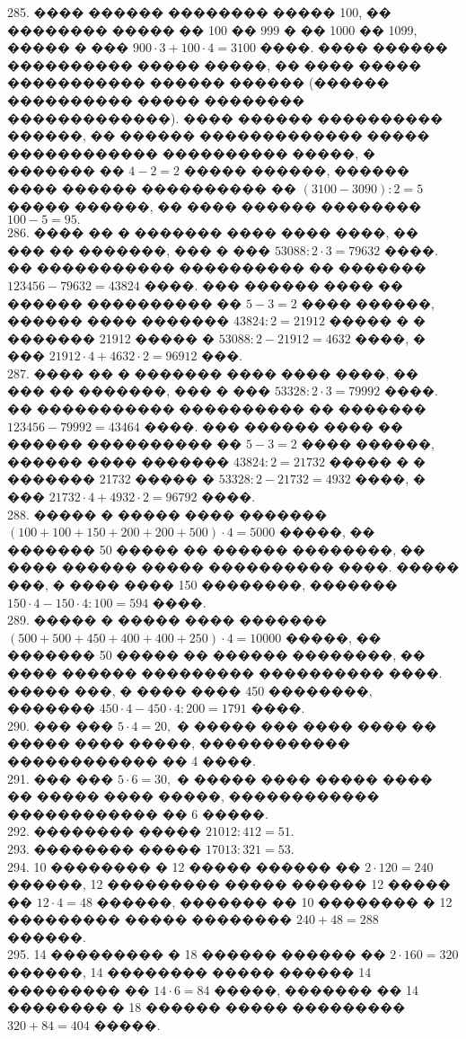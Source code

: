 \documentclass[12pt]{article}
\begin{document}
285. ���� ������ �������� ����� 100, �� �������� ����� �� 100 �� 999 � �� 1000 �� 1099, ����� � ��� $900\cdot3+100\cdot4=3100$ ����. ���� ������ ���������� ����� �����, �� ���� ����� ����������� ������ ������ (������ ���������� ����� �������� �������������). ���� ������ ���������� ������, �� ������ ������������� ����� ������������ ���������� �����, � ������� �� $4-2=2$ ����� ������, ������ ���� ������ ���������� �� $(3100-3090):2=5$ ����� ������, �� ���� ������ �������� $100-5=95.$\\
286. ���� �� � ������� ���� ���� ����, �� ��� �� �������, ��� � ��� $53088:2\cdot3=79632$ ����. �� ����������� ���������� �� ������� $123456-79632=43824$ ����. ��� ������ ���� �� ������ ���������� �� $5-3=2$ ���� ������, ������ ���� ������� $43824:2=21912$ ����� � � ������� 21912 ����� � $53088:2-21912=4632$ ����, � ��� $21912\cdot4+4632\cdot2=96912$ ���.\\
287. ���� �� � ������� ���� ���� ����, �� ��� �� �������, ��� � ��� $53328:2\cdot3=79992$ ����. �� ����������� ���������� �� ������� $123456-79992=43464$ ����. ��� ������ ���� �� ������ ���������� �� $5-3=2$ ���� ������, ������ ���� ������� $43824:2=21732$ ����� � � ������� 21732 ����� � $53328:2-21732=4932$ ����, � ��� $21732\cdot4+4932\cdot2=96792$ ����.\\
288. ����� � ����� ���� ������� $(100+100+150+200+200+500)\cdot4=5000$ �����, �� ������� 50 ����� �� ������ ��������, �� ���� ������ ����� ���������� ����. ����� ���, � ���� ���� 150 ��������, ������� $150\cdot4-150\cdot4:100=594$ ����.\\
289. ����� � ����� ���� ������� $(500+500+450+400+400+250)\cdot4=10000$ �����, �� ������� 50 ����� �� ������ ��������, �� ���� ������ ��������� ���������� ����. ����� ���, � ���� ���� 450 ��������, ������� $450\cdot4-450\cdot4:200=1791$ ����.\\
290. ��� ��� $5\cdot4=20,$ � ����� ��� ���� ���� �� ����� ���� �����, ������������ ������������ �� 4 ����.\\
291. ��� ��� $5\cdot6=30,$ � ����� ���� ����� ���� �� ����� ���� �����, ������������ ������������ �� 6 �����.\\
292. �������� ����� $21012:412=51.$\\
293. �������� ����� $17013:321=53.$\\
294. 10 �������� � 12 ����� ������ �� $2\cdot120=240$ ������, 12 ��������� ����� ������ 12 ����� �� $12\cdot4=48$ ������, ������� �� 10 �������� � 12 ��������� ����� �������� $240+48=288$ ������.\\
295. 14 ��������� � 18 ������ ������ �� $2\cdot160=320$ ������, 14 �������� ����� ������ 14 ��������� �� $14\cdot6=84$ �����, ������� �� 14 �������� � 18 ������ ����� ��������� $320+84=404$ �����.\\
\end{document}
